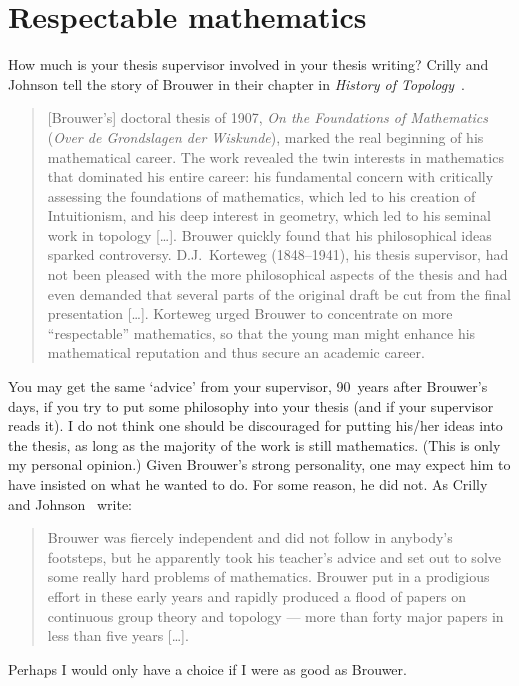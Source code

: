 \documentclass{bhamthesis}
\theoremstyle{definition}
\newcommand{\bktitle}[1]{\textit{#1}}
\begin{document}
\section{Respectable mathematics}
How much is your thesis supervisor involved in your thesis
writing?  Crilly and Johnson tell the story of Brouwer in their
chapter in \bktitle{History of
Topology}~\cite[Section~7]{incoll:emerg-topodim}.
\begin{quotation}
 [Brouwer's] doctoral thesis of 1907, \textit{On the Foundations
 of Mathematics} (\textit{Over de Grondslagen der Wiskunde}),
 marked the real beginning of his mathematical career.  The work
 revealed the twin interests in mathematics that dominated his
 entire career: his fundamental concern with critically assessing
 the foundations of mathematics, which led to his creation of
 Intuitionism, and his deep interest in geometry, which led to his
 seminal work in topology [\ldots].  Brouwer quickly found that
 his philosophical ideas sparked controversy.  D.J.~Korteweg
 (1848--1941), his thesis supervisor, had not been pleased with
 the more philosophical aspects of the thesis and had even
 demanded that several parts of the original draft be cut from the
 final presentation [\ldots].  Korteweg urged Brouwer to
 concentrate on more ``respectable'' mathematics, so that the
 young man might enhance his mathematical reputation and thus
 secure an academic career.
\end{quotation}
You may get the same `advice' from your supervisor, 90~years after
Brouwer's days, if you try to put some philosophy into your thesis
(and if your supervisor reads it).  I do not think one should be
discouraged for putting his/her ideas into the thesis, as long as
the majority of the work is still mathematics.  (This is only my
personal opinion.)  Given Brouwer's strong personality, one may
expect him to have insisted on what he wanted to do.  For some
reason, he did not.  As Crilly and
Johnson~\cite{incoll:emerg-topodim} write:
\begin{quotation}
 Brouwer was fiercely independent and did not follow in anybody's
 footsteps, but he apparently took his teacher's advice and set
 out to solve some really hard problems of mathematics.  Brouwer
 put in a prodigious effort in these early years and rapidly
 produced a flood of papers on continuous group theory and
 topology --- more than forty major papers in less than five
 years [\ldots].
\end{quotation}
Perhaps I would only have a choice if I were as good as Brouwer.
\end{document}
